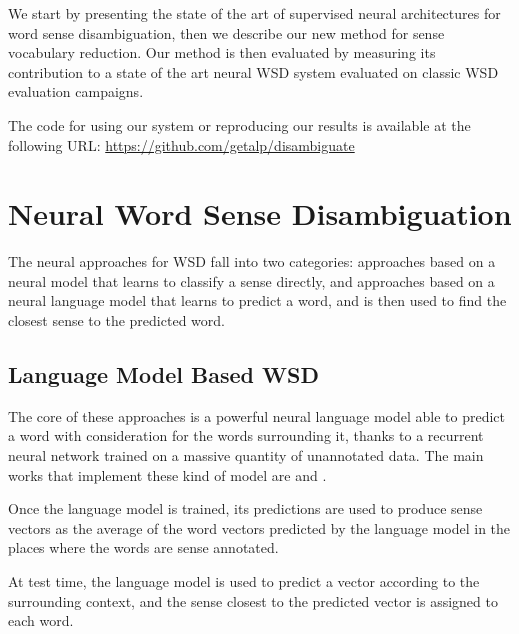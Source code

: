 \documentclass[11pt,a4paper]{article}
\begin{document}
We start by presenting the state of the art of supervised neural architectures for word sense disambiguation, then we describe our new method for sense vocabulary reduction. Our method is then evaluated by measuring its contribution to a state of the art neural WSD system evaluated on classic WSD evaluation campaigns.

The code for using our system or reproducing our results is available at the following URL:\newline
\url{https://github.com/getalp/disambiguate}






























\section{Neural Word Sense Disambiguation}

The neural approaches for WSD fall into two categories: approaches based on a neural model that learns to classify a sense directly, and approaches based on a neural language model that learns to predict a word, and is then used to find the closest sense to the predicted word.

\subsection{Language Model Based WSD}

The core of these approaches is a powerful neural language model able to predict a word with consideration for the words surrounding it, thanks to a recurrent neural network trained on a massive quantity of unannotated data. The main works that implement these kind of model are \citet{yuan_2016} and \citet{minh2018}.

Once the language model is trained, its predictions are used to produce sense vectors as the average of the word vectors predicted by the language model in the places where the words are sense annotated.

At test time, the language model is used to predict a vector according to the surrounding context, and the sense closest to the predicted vector is assigned to each word.
\end{document}
